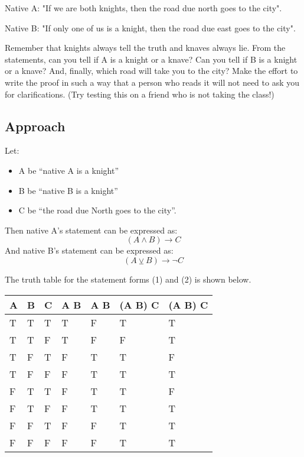 \documentclass{article}
\begin{document}
Native A: "If we are both knights, then the road due north goes to the city".

Native B: "If only one of us is a knight, then the road due east goes to the city".

Remember that knights always tell the truth and knaves always lie. From the statements, can you tell if A is a knight or a knave? Can you tell if B is a knight or a knave? And, finally, which road will take you to the city?
Make the effort to write the proof in such a way that a person who reads it will not need to ask you for clarifications. (Try testing this on a friend who is not taking the class!)

\subsection{Approach}
Let:
\begin{itemize}[noitemsep, nolistsep]
	\item A be ``native A is a knight''
	\item B be ``native B is a knight''
	\item C be ``the road due North goes to the city''. 
\end{itemize}

Then native A's statement can be expressed as: 
\begin{equation}
	(A \land B) \rightarrow C
\end{equation}
And native B's statement can be expressed as:
\begin{equation}
	(A \veebar B) \rightarrow \lnot C
\end{equation}

The truth table for the statement forms (1) and (2) is shown below.

\begin{center}
	\begin{tabular}{ L L L | L | L | L | L }
		A & B & C & A \land B & A \veebar B & (A \land B) \rightarrow C & (A \land B) \rightarrow C \\
		\hline
		T & T & T & T & F & T & T \\ 
		T & T & F & T & F & F & T \\  
		T & F & T & F & T & T & F \\
		T & F & F & F & T & T & T \\
		F & T & T & F & T & T & F \\ 
		F & T & F & F & T & T & T \\  
		F & F & T & F & F & T & T \\
		F & F & F & F & F & T & T 
	\end{tabular}
\end{center}
\end{document}
